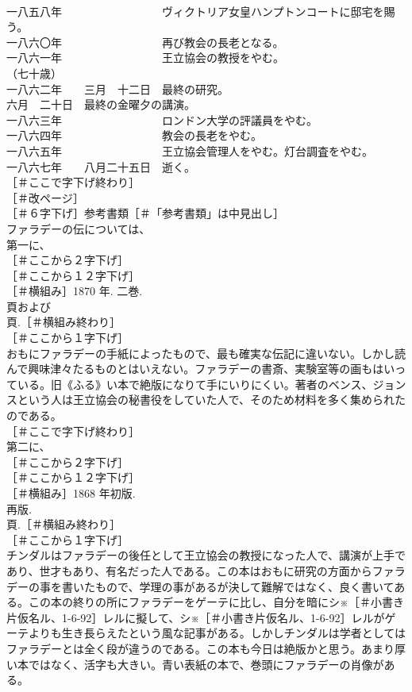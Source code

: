 \documentclass[8pt]{extreport}
\begin{document}
\begin{CJK}{UTF8}{min}
\\	一八五八年　　　　　　　　　ヴィクトリア女皇ハンプトンコートに邸宅を賜う。
\\	一八六〇年　　　　　　　　　再び教会の長老となる。
\\	一八六一年　　　　　　　　　王立協会の教授をやむ。
\\	（七十歳）
\\	一八六二年　　三月　十二日　最終の研究。
\\	六月　二十日　最終の金曜夕の講演。
\\	一八六三年　　　　　　　　　ロンドン大学の評議員をやむ。
\\	一八六四年　　　　　　　　　教会の長老をやむ。
\\	一八六五年　　　　　　　　　王立協会管理人をやむ。灯台調査をやむ。
\\	一八六七年　　八月二十五日　逝く。
\\	［＃ここで字下げ終わり］
\\	［＃改ページ］
\\	［＃６字下げ］参考書類［＃「参考書類」は中見出し］
\\	ファラデーの伝については、
\\	第一に、
\\	［＃ここから２字下げ］
\\	［＃ここから１２字下げ］
\\	［＃横組み］1870 年. 二巻. 
\\	頁および 
\\	頁.［＃横組み終わり］
\\	［＃ここから１字下げ］
\\	おもにファラデーの手紙によったもので、最も確実な伝記に違いない。しかし読んで興味津々たるものとはいえない。ファラデーの書斎、実験室等の画もはいっている。旧《ふる》い本で絶版になりて手にいりにくい。著者のベンス、ジョンスという人は王立協会の秘書役をしていた人で、そのため材料を多く集められたのである。
\\	［＃ここで字下げ終わり］
\\	第二に、
\\	［＃ここから２字下げ］
\\	［＃ここから１２字下げ］
\\	［＃横組み］1868 年初版. 
\\	再版. 
\\	頁.［＃横組み終わり］
\\	［＃ここから１字下げ］
\\	チンダルはファラデーの後任として王立協会の教授になった人で、講演が上手であり、世才もあり、有名だった人である。この本はおもに研究の方面からファラデーの事を書いたもので、学理の事があるが決して難解ではなく、良く書いてある。この本の終りの所にファラデーをゲーテに比し、自分を暗にシ※［＃小書き片仮名ル、1-6-92］レルに擬して、シ※［＃小書き片仮名ル、1-6-92］レルがゲーテよりも生き長らえたという風な記事がある。しかしチンダルは学者としてはファラデーとは全く段が違うのである。この本も今日は絶版かと思う。あまり厚い本ではなく、活字も大きい。青い表紙の本で、巻頭にファラデーの肖像がある。

\end{CJK}
\end{document}
